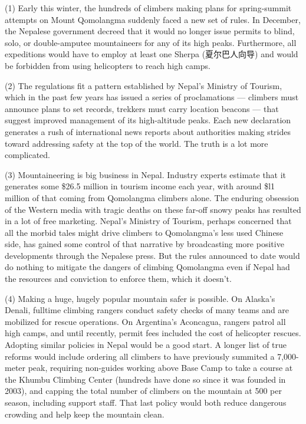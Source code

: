 \documentclass[UTF8,11pt]{ctexart}
\begin{document}
(1) Early this winter, the hundreds of climbers making plans for spring-summit attempts on Mount Qomolangma suddenly faced a new set of rules. In December, the Nepalese government decreed that it would no longer issue permits to blind, solo, or double-amputee mountaineers for any of its high peaks. Furthermore, all expeditions would have to employ at least one Sherpa (夏尔巴人向导) and would be forbidden from using helicopters to reach high camps.


(2) The regulations fit a pattern established by Nepal’s Ministry of Tourism, which in the past few years has issued a series of proclamations — climbers must announce plans to set records, trekkers must carry location beacons — that suggest improved management of its high-altitude peaks. Each new declaration generates a rush of international news reports about authorities making strides toward addressing safety at the top of the world. The truth is a lot more complicated.


(3) Mountaineering is big business in Nepal. Industry experts estimate that it generates some \$26.5 million in tourism income each year, with around \$l1 million of that coming from Qomolangma climbers alone. The enduring obsession of the Western media with tragic deaths on these far-off snowy peaks has resulted in a lot of free marketing. Nepal’s Ministry of Tourism, perhaps concerned that all the morbid tales might drive climbers to Qomolangma’s less used Chinese side, has gained some control of that narrative by broadcasting more positive developments through the Nepalese press. But the rules announced to date would do nothing to mitigate the dangers of climbing Qomolangma even if Nepal had the resources and conviction to enforce them, which it doesn’t.


(4) Making a huge, hugely popular mountain safer is possible. On Alaska’s Denali, fulltime climbing rangers conduct safety checks of many teams and are mobilized for rescue operations. On Argentina’s Aconcagua, rangers patrol all high camps, and until recently, permit fees included the cost of helicopter rescues. Adopting similar policies in Nepal would be a good start. A longer list of true reforms would include ordering all climbers to have previously summited a 7,000-meter peak, requiring non-guides working above Base Camp to take a course at the Khumbu Climbing Center (hundreds have done so since it was founded in 2003), and capping the total number of climbers on the mountain at 500 per season, including support staff. That last policy would both reduce dangerous crowding and help keep the mountain clean.
\end{document}
